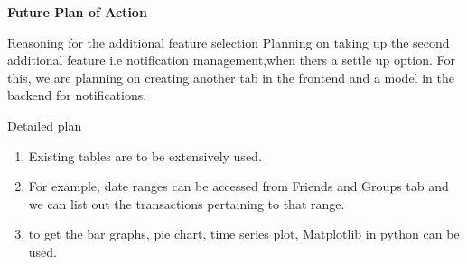 \documentclass{beamer}
\begin{document}
\begin{frame}[fragile]{\bf  Future Plan of Action}
\begin{block}{Reasoning for the additional feature selection}
Planning on taking up the second additional feature i.e notification management,when thers a settle up option.
For this, we are planning on creating another tab in the frontend and a model in the backend for notifications. 
\end{block}
\begin{block}{Detailed plan}
\begin{enumerate}
\item Existing tables are to be extensively used.
\item For example, date ranges can be accessed from Friends and Groups tab and we can list out the transactions pertaining to that range.
\item to get the bar graphs, pie chart, time series plot, Matplotlib in python can be used. 
\end{enumerate}
\end{block}
\end{frame}
\end{document}
